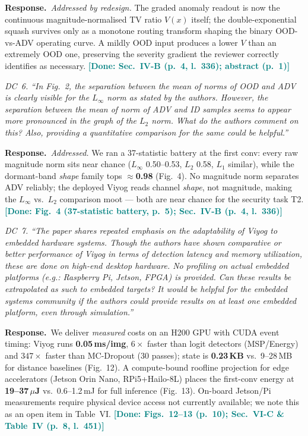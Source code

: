 \documentclass[10pt,letterpaper,journal]{IEEEtran}
\newcommand{\rc}[1]{\smallskip\noindent\textit{\textcolor{black!75}{#1}}\par\smallskip}
\newcommand{\rr}{\noindent\textbf{Response.}~}
\newcommand{\done}[1]{\textcolor{teal}{\textbf{[Done: #1]}}}
\begin{document}
\rr \emph{Addressed by redesign.} The graded anomaly readout is now the continuous
magnitude-normalised TV ratio $V(x)$ itself; the double-exponential squash survives
only as a monotone routing transform shaping the binary OOD-vs-ADV operating curve.
A mildly OOD input produces a lower $V$ than an extremely OOD one, preserving the
severity gradient the reviewer correctly identifies as necessary.
\done{Sec.~IV-B (p.~4, l.~336); abstract (p.~1)}

\rc{DC~6. ``In Fig.~2, the separation between the mean of norms of OOD and ADV is
clearly visible for the $L_\infty$ norm as stated by the authors. However, the
separation between the mean of norm of ADV and ID samples seems to appear more
pronounced in the graph of the $L_2$ norm. What do the authors comment on this?
Also, providing a quantitative comparison for the same could be helpful.''}

\rr \emph{Addressed.} We ran a 37-statistic battery at the first conv: every
raw magnitude norm sits near chance ($L_\infty$ 0.50--0.53, $L_2$ 0.58, $L_1$
similar), while the dormant-band \emph{shape} family tops $\approx$\textbf{0.98}
(Fig.~4). No magnitude norm separates ADV reliably; the deployed Viyog reads channel
\emph{shape}, not magnitude, making the $L_\infty$ vs.\ $L_2$ comparison moot ---
both are near chance for the security task T2.
\done{Fig.~4 (37-statistic battery, p.~5); Sec.~IV-B (p.~4, l.~336)}

\rc{DC~7. ``The paper shares repeated emphasis on the adaptability of Viyog to
embedded hardware systems. Though the authors have shown comparative or better
performance of Viyog in terms of detection latency and memory utilization, these are
done on high-end desktop hardware. No profiling on actual embedded platforms (e.g.:
Raspberry Pi, Jetson, FPGA) is provided. Can these results be extrapolated as such
to embedded targets? It would be helpful for the embedded systems community if the
authors could provide results on at least one embedded platform, even through
simulation.''}

\rr We deliver \emph{measured} costs on an H200 GPU with CUDA event timing:
Viyog runs \textbf{0.05\,ms/img}, $6\times$ faster than logit detectors
(MSP/Energy) and $347\times$ faster than MC-Dropout (30 passes); state is
\textbf{0.23\,KB} vs.\ 9--28\,MB for distance baselines (Fig.~12). A
compute-bound roofline projection for edge accelerators (Jetson Orin Nano,
RPi5+Hailo-8L) places the first-conv energy at \textbf{19--37\,$\mu$J} vs.\
0.6--1.2\,mJ for full inference (Fig.~13). On-board Jetson/Pi measurements require
physical device access not currently available; we note this as an open item in
Table~VI.
\done{Figs.~12--13 (p.~10); Sec.~VI-C \& Table~IV (p.~8, l.~451)}
\end{document}
